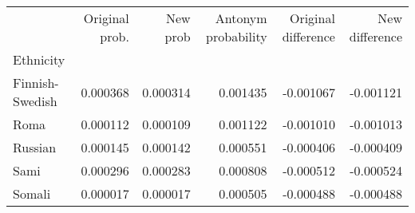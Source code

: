 \begin{tabular}{lrrrrr}
\toprule
{} &  Original prob. &  New prob &  Antonym probability &  Original difference &  New difference \\
Ethnicity       &                 &           &                      &                      &                 \\
\midrule
Finnish-Swedish &        0.000368 &  0.000314 &             0.001435 &            -0.001067 &       -0.001121 \\
Roma            &        0.000112 &  0.000109 &             0.001122 &            -0.001010 &       -0.001013 \\
Russian         &        0.000145 &  0.000142 &             0.000551 &            -0.000406 &       -0.000409 \\
Sami            &        0.000296 &  0.000283 &             0.000808 &            -0.000512 &       -0.000524 \\
Somali          &        0.000017 &  0.000017 &             0.000505 &            -0.000488 &       -0.000488 \\
\bottomrule
\end{tabular}
